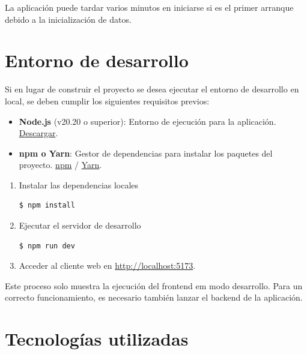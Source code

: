 \documentclass[11pt]{article}
\begin{document}
      \begin{info}[Observaciones]
          La aplicación puede tardar varios minutos en iniciarse si es el primer arranque debido a la inicialización de datos.
      \end{info}

\section{Entorno de desarrollo}

  Si en lugar de construir el proyecto se desea ejecutar el entorno de desarrollo
  en local, se deben cumplir los siguientes requisitos previos:

  \begin{itemize}
      \item \textbf{Node.js} (v20.20 o superior): Entorno de ejecución para la aplicación. \href{https://nodejs.org/}{Descargar}.
      \item \textbf{npm o Yarn}: Gestor de dependencias para instalar los paquetes del proyecto. \href{https://www.npmjs.com/}{npm} / \href{https://yarnpkg.com/}{Yarn}.
  \end{itemize}

  \begin{enumerate}
      \item Instalar las dependencias locales

            \begin{lstlisting}[style=BashStyle, numbers=none]
$ npm install
\end{lstlisting}

      \item Ejecutar el servidor de desarrollo

            \begin{lstlisting}[style=BashStyle, numbers=none]
$ npm run dev
\end{lstlisting}

      \item Acceder al cliente web en \href{http://localhost:5173}{http://localhost:5173}.
  \end{enumerate}

  \begin{info}[Observaciones]
      Este proceso solo muestra la ejecución del frontend em modo desarrollo. Para un correcto funcionamiento, es
      necesario también lanzar el backend de la aplicación.
  \end{info}

\section{Tecnologías utilizadas}
\end{document}
